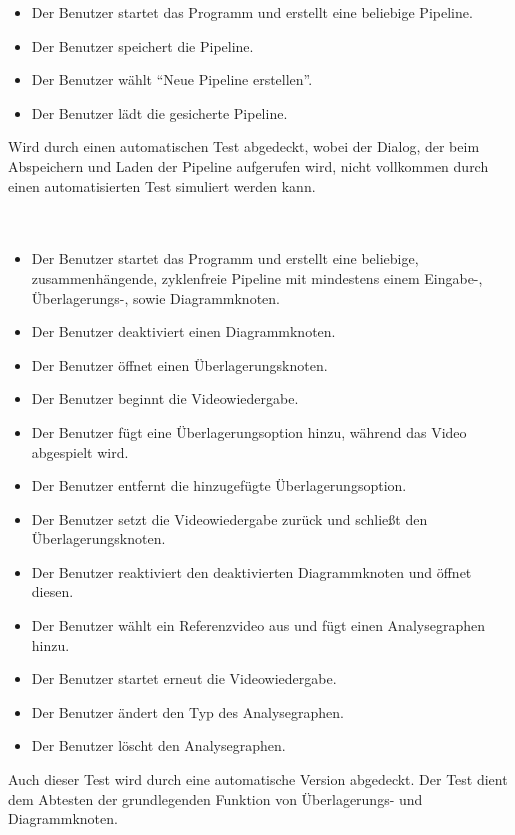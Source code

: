 \begin{itemize}
	\item Der Benutzer startet das Programm und erstellt eine beliebige Pipeline.
	\item Der Benutzer speichert die Pipeline.
	\item Der Benutzer wählt ``Neue Pipeline erstellen''.
	\item Der Benutzer lädt die gesicherte Pipeline.
\end{itemize}

Wird durch einen automatischen Test abgedeckt, wobei der Dialog, der beim Abspeichern und Laden der Pipeline aufgerufen wird, nicht vollkommen durch einen automatisierten Test simuliert werden kann.

\paragraph{}

\paragraph{} ~\\
 
\begin{itemize}
	\item Der Benutzer startet das Programm und erstellt eine beliebige, zusammenhängende, zyklenfreie Pipeline mit mindestens einem Eingabe-, Überlagerungs-, sowie Diagrammknoten.
	\item Der Benutzer deaktiviert einen Diagrammknoten.
	\item Der Benutzer öffnet einen Überlagerungsknoten.
	\item Der Benutzer beginnt die Videowiedergabe.
	\item Der Benutzer fügt eine Überlagerungsoption hinzu, während das Video abgespielt wird.
	\item Der Benutzer entfernt die hinzugefügte Überlagerungsoption.
	\item Der Benutzer setzt die Videowiedergabe zurück und schließt den Überlagerungsknoten.
	\item Der Benutzer reaktiviert den deaktivierten Diagrammknoten und öffnet diesen.
	\item Der Benutzer wählt ein Referenzvideo aus und fügt einen Analysegraphen hinzu.
	\item Der Benutzer startet erneut die Videowiedergabe.
	\item Der Benutzer ändert den Typ des Analysegraphen.
	\item Der Benutzer löscht den Analysegraphen.
\end{itemize}

Auch dieser Test wird durch eine automatische Version abgedeckt. Der Test dient dem Abtesten der grundlegenden Funktion von Überlagerungs- und Diagrammknoten.
